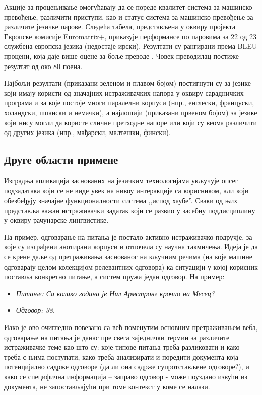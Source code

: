{\begin{multicols}{2}
Акције за процењивање омогућавају да се пореде квалитет система за машинско превођење, различити приступи, као и статус система за машинско превођење за различите језичке парове. Следећа табела, представљена у оквиру пројекта Европске комисије Euromatrix+, приказује перформансе по паровима за 22 од 23 службена европска језика (недостаје ирски). Резултати су рангирани према BLEU процени, која даје више оцене за боље преводе \cite{bleu1}. Човек-преводилац постиже резултат од око 80 поена. 

Најбољи резултати (приказани зеленом и плавом бојом) постигнути су за језике који имају користи од значајних истраживачких напора у оквиру сарадничких програма и за које постоје многи паралелни корпуси (нпр., енглески, француски, холандски, шпански и немачки), а најлошији (приказани црвеном бојом) за језике који нису могли да користе сличне претходне напоре или који су веома различити од других језика (нпр., мађарски, малтешки, фински). 

 \subsection {Друге области примене}
   
Изградња апликација заснованих на језичким технологијама укључује опсег подзадатака који се не виде увек на нивоу интеракције са корисником, али који обезбеђују значајне функционалности система ,,испод хаубе''. Сваки од њих представља важан истраживачки задатак који се развио у засебну поддисциплину у оквиру рачунарске лингвистике.

На пример, одговарање на питања је постало активно истраживачко подручје, за које су изграђени анотирани корпуси и отпочела су научна такмичења. Идеја је да се крене даље од претраживања заснованог на кључним речима (на које машине одговарају целом колекцијом релевантних одговора) ка ситуацији у којој корисник поставља конкретно питање, а систем пружа један одговор. На пример: 
\begin{itemize}
\item[] \textit{Питање: Са колико година је Нил Армстронг крочио на Месец?} 
\item[] \textit{Одговор: 38}. 
\end{itemize}

Иако је ово очигледно повезано са већ поменутим основним претраживањем веба, одговарање на питања је данас пре свега заједнички термин за различите истраживачке теме као што су: које типове питања треба разликовати и како треба с њима поступати, како треба анализирати и поредити документа која потенцијално садрже одговоре (да ли она садрже супротстављене одговоре?), и како се специфична информација – заправо одговор -  може поуздано извући из документа, не запостављајући при томе контекст у коме се налази. 


\end{multicols}}
